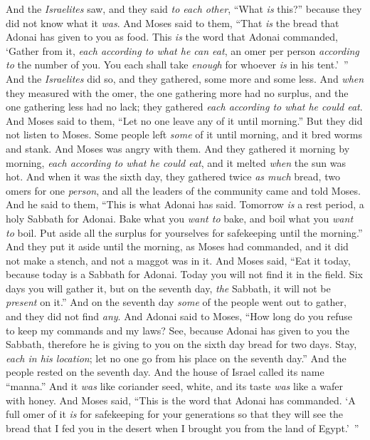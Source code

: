 \begin{biblechapter}
\verse And the \textit{Israelites} saw, and they said \textit{to each other}, “What \textit{is} this?” because they did not know what it \textit{was}. And Moses said to them, “That \textit{is} the bread that Adonai has given to you as food.
\verse This \textit{is} the word that Adonai commanded, ‘Gather from it, \textit{each according to what he can eat}, an omer per person \textit{according to} the number of you. You each shall take \textit{enough} for whoever \textit{is} in his tent.’ ”
\verse And the \textit{Israelites} did so, and they gathered, some more and some less.
\verse And \textit{when} they measured with the omer, the one gathering more had no surplus, and the one gathering less had no lack; they gathered \textit{each according to what he could eat}.
\verse And Moses said to them, “Let no one leave any of it until morning.”
\verse But they did not listen to Moses. Some people left \textit{some} of it until morning, and it bred worms and stank. And Moses was angry with them.
\verse And they gathered it morning by morning, \textit{each according to what he could eat}, and it melted \textit{when} the sun was hot.
\verse And when it was the sixth day, they gathered twice \textit{as much} bread, two omers for one \textit{person}, and all the leaders of the community came and told Moses.
\verse And he said to them, “This is what Adonai has said. Tomorrow \textit{is} a rest period, a holy Sabbath for Adonai. Bake what you \textit{want to} bake, and boil what you \textit{want to} boil. Put aside all the surplus for yourselves for safekeeping until the morning.”
\verse And they put it aside until the morning, as Moses had commanded, and it did not make a stench, and not a maggot was in it.
\verse And Moses said, “Eat it today, because today is a Sabbath for Adonai. Today you will not find it in the field.
\verse Six days you will gather it, but on the seventh day, \textit{the} Sabbath, it will not be \textit{present} on it.”
\verse And on the seventh day \textit{some} of the people went out to gather, and they did not find \textit{any}.
\verse And Adonai said to Moses, “How long do you refuse to keep my commands and my laws?
\verse See, because Adonai has given to you the Sabbath, therefore he is giving to you on the sixth day bread for two days. Stay, \textit{each in his location}; let no one go from his place on the seventh day.”
\verse And the people rested on the seventh day.
\verse And the house of Israel called its name “manna.” And it \textit{was} like coriander seed, white, and its taste \textit{was} like a wafer with honey.
\verse And Moses said, “This is the word that Adonai has commanded. ‘A full omer of it \textit{is} for safekeeping for your generations so that they will see the bread that I fed you in the desert when I brought you from the land of Egypt.’ ”

\end{biblechapter}
